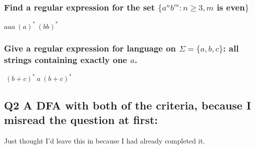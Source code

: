 \documentclass{article}
\begin{document}
\subsubsection*{Find a regular expression for the set $\{ a^nb^m : n \geq 3, m$ is even$\}$}
\hspace*{1cm} $aaa\ (a)^*\ (bb)^*$

\vspace*{5mm}
\subsubsection*{Give a regular expression for language on $\Sigma = \{ a,b,c \}$: all strings containing exactly one $a$.}
\hspace*{1cm} $\ (b + c)^*\ a\ (b+c)^* $




\pagebreak

\subsection*{Q2 A DFA with both of the criteria, because I misread the question at first:}

Just thought I'd leave this in because I had already completed it.
\end{document}
